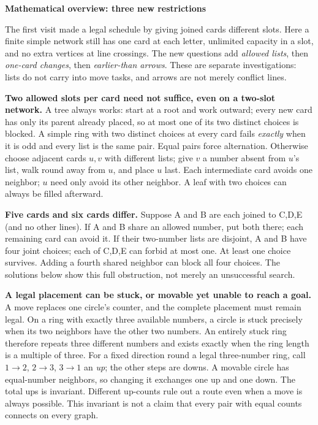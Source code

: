 \documentclass[10pt]{article}
\newcommand{\head}[1]{\par{\large\bfseries #1}\par}
\begin{document}
\head{Mathematical overview: three new restrictions}
The first visit made a legal schedule by giving joined cards different slots. Here a finite simple network still has one card at each letter, unlimited capacity in a slot, and no extra vertices at line crossings. The new questions add \emph{allowed lists}, then \emph{one-card changes}, then \emph{earlier-than arrows}. These are separate investigations: lists do not carry into move tasks, and arrows are not merely conflict lines.

\textbf{Two allowed slots per card need not suffice, even on a two-slot network.} A tree always works: start at a root and work outward; every new card has only its parent already placed, so at most one of its two distinct choices is blocked. A simple ring with two distinct choices at every card fails \emph{exactly} when it is odd and every list is the same pair. Equal pairs force alternation. Otherwise choose adjacent cards $u,v$ with different lists; give $v$ a number absent from $u$'s list, walk round away from $u$, and place $u$ last. Each intermediate card avoids one neighbor; $u$ need only avoid its other neighbor. A leaf with two choices can always be filled afterward.

\textbf{Five cards and six cards differ.} Suppose A and B are each joined to C,D,E (and no other lines). If A and B share an allowed number, put both there; each remaining card can avoid it. If their two-number lists are disjoint, A and B have four joint choices; each of C,D,E can forbid at most one. At least one choice survives. Adding a fourth shared neighbor can block all four choices. The solutions below show this full obstruction, not merely an unsuccessful search.

\textbf{A legal placement can be stuck, or movable yet unable to reach a goal.} A move replaces one circle's counter, and the complete placement must remain legal. On a ring with exactly three available numbers, a circle is stuck precisely when its two neighbors have the other two numbers. An entirely stuck ring therefore repeats three different numbers and exists exactly when the ring length is a multiple of three. For a fixed direction round a legal three-number ring, call $1\to2$, $2\to3$, $3\to1$ an \emph{up}; the other steps are downs. A movable circle has equal-number neighbors, so changing it exchanges one up and one down. The total ups is invariant. Different up-counts rule out a route even when a move is always possible. This invariant is not a claim that every pair with equal counts connects on every graph.
\end{document}
